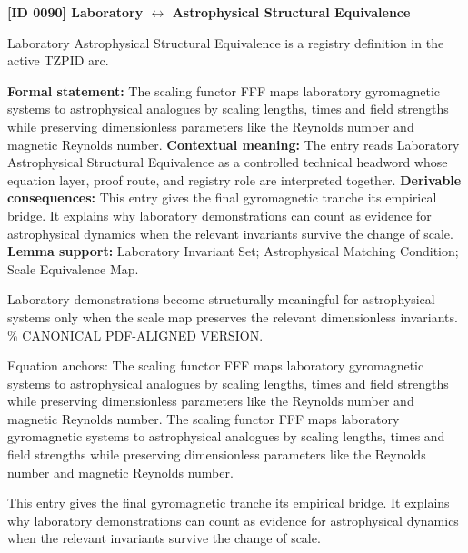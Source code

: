 \clearpage
\noindent\textbf{[ID 0090] Laboratory $\leftrightarrow$ Astrophysical Structural Equivalence}\par
\vspace{0.35em}
\begingroup\small
{}
Laboratory   Astrophysical Structural Equivalence is a registry definition in the active TZPID arc.

\begingroup\footnotesize\setlength{\emergencystretch}{3em}\sloppy
\textbf{Formal statement:} The scaling functor FFF maps laboratory gyromagnetic systems to astrophysical analogues by scaling lengths, times and field strengths while preserving dimensionless parameters like the Reynolds number and magnetic Reynolds number. \textbf{Contextual meaning:} The entry reads Laboratory   Astrophysical Structural Equivalence as a controlled technical headword whose equation layer, proof route, and registry role are interpreted together. \textbf{Derivable consequences:} This entry gives the final gyromagnetic tranche its empirical bridge. It explains why laboratory demonstrations can count as evidence for astrophysical dynamics when the relevant invariants survive the change of scale. \textbf{Lemma support:} Laboratory Invariant Set; Astrophysical Matching Condition; Scale Equivalence Map.\par
\endgroup

Laboratory demonstrations become structurally meaningful for astrophysical systems only when the scale map preserves the relevant dimensionless invariants. \% CANONICAL PDF-ALIGNED VERSION.

Equation anchors: The scaling functor FFF maps laboratory gyromagnetic systems to astrophysical analogues by scaling lengths, times and field strengths while preserving dimensionless parameters like the Reynolds number and magnetic Reynolds number. The scaling functor FFF maps laboratory gyromagnetic systems to astrophysical analogues by scaling lengths, times and field strengths while preserving dimensionless parameters like the Reynolds number and magnetic Reynolds number.

This entry gives the final gyromagnetic tranche its empirical bridge. It explains why laboratory demonstrations can count as evidence for astrophysical dynamics when the relevant invariants survive the change of scale.
\endgroup

